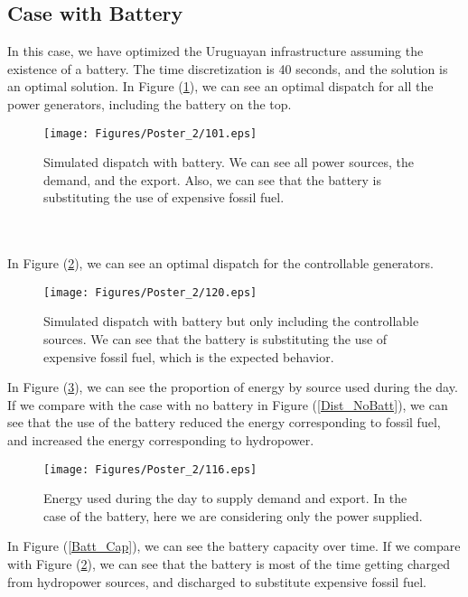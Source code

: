 \documentclass[ima, 20pt, portrait, plainboxedsections]{sciposter}
\begin{document}
\begin{multicols}{3}
\subsection*{Case with Battery}

In this case, we have optimized the Uruguayan infrastructure assuming the existence of a battery. The time discretization is 40 seconds, and the solution is an optimal solution. In Figure (\ref{Balance_Batt}), we can see an optimal dispatch for all the power generators, including the battery on the top.

\begin{figure}[ht!]
\centering
\texttt{[image: Figures/Poster\_2/101.eps]}
\caption{Simulated dispatch with battery. We can see all power sources, the demand, and the export. Also, we can see that the battery is substituting the use of expensive fossil fuel.}
\label{Balance_Batt}
\end{figure} 
\quad\\
\quad\\
In Figure (\ref{Balance_Batt_Cont}), we can see an optimal dispatch for the controllable generators.

\begin{figure}[ht!]
\centering
\texttt{[image: Figures/Poster\_2/120.eps]}
\caption{Simulated dispatch with battery but only including the controllable sources. We can see that the battery is substituting the use of expensive fossil fuel, which is the expected behavior.}
\label{Balance_Batt_Cont}
\end{figure}

 In Figure (\ref{Dist_Batt}), we can see the proportion of energy by source used during the day. If we compare with the case with no battery in Figure (\ref{Dist_NoBatt}), we can see that the use of the battery reduced the energy corresponding to fossil fuel, and increased the energy corresponding to hydropower.

\begin{figure}[ht!]
\centering
\texttt{[image: Figures/Poster\_2/116.eps]}
\caption{Energy used during the day to supply demand and export. In the case of the battery, here we are considering only the power supplied.}
\label{Dist_Batt}
\end{figure} 

In Figure (\ref{Batt_Cap}), we can see the battery capacity over time. If we compare with Figure (\ref{Balance_Batt_Cont}), we can see that the battery is most of the time getting charged from hydropower sources, and discharged to substitute expensive fossil fuel.\\


\end{multicols}
\end{document}
